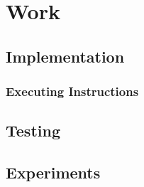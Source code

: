 \chapter{Work}

\section{Implementation}
\subsection{Executing Instructions}

\section{Testing}

\section{Experiments}